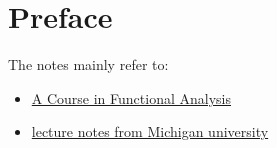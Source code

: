 \chapter*{Preface}

The notes mainly refer to:
\begin{itemize}
    \item \href{}{A Course in Functional Analysis}
    \item \href{https://users.math.msu.edu/users/banelson/teaching/920/chI_notes.pdf}{lecture notes from Michigan university}
\end{itemize}
